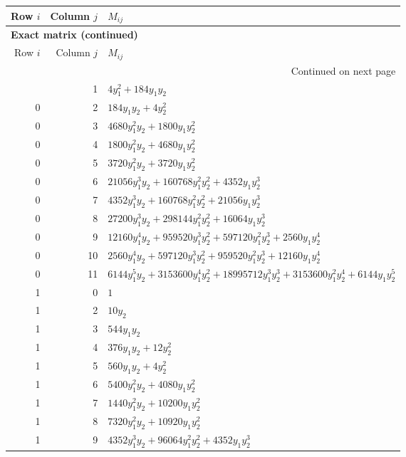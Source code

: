 \documentclass[10pt,a4paper]{article}
\begin{document}
{\small\setlength{\tabcolsep}{7pt}\begin{longtable}{rrp{125mm}}
\toprule Row $i$ & Column $j$ & $M_{ij}$\\\midrule\endfirsthead
\multicolumn{3}{l}{\textbf{Exact matrix (continued)}}\\
\toprule Row $i$ & Column $j$ & $M_{ij}$\\\midrule\endhead
\midrule\multicolumn{3}{r}{Continued on next page}\\\endfoot\bottomrule\endlastfoot
0 & 1 & $4 y_{1}^{2} + 184 y_{1} y_{2}$\\
0 & 2 & $184 y_{1} y_{2} + 4 y_{2}^{2}$\\
0 & 3 & $4680 y_{1}^{2} y_{2} + 1800 y_{1} y_{2}^{2}$\\
0 & 4 & $1800 y_{1}^{2} y_{2} + 4680 y_{1} y_{2}^{2}$\\
0 & 5 & $3720 y_{1}^{2} y_{2} + 3720 y_{1} y_{2}^{2}$\\
0 & 6 & $21056 y_{1}^{3} y_{2} + 160768 y_{1}^{2} y_{2}^{2} + 4352 y_{1} y_{2}^{3}$\\
0 & 7 & $4352 y_{1}^{3} y_{2} + 160768 y_{1}^{2} y_{2}^{2} + 21056 y_{1} y_{2}^{3}$\\
0 & 8 & $27200 y_{1}^{3} y_{2} + 298144 y_{1}^{2} y_{2}^{2} + 16064 y_{1} y_{2}^{3}$\\
0 & 9 & $12160 y_{1}^{4} y_{2} + 959520 y_{1}^{3} y_{2}^{2} + 597120 y_{1}^{2} y_{2}^{3} + 2560 y_{1} y_{2}^{4}$\\
0 & 10 & $2560 y_{1}^{4} y_{2} + 597120 y_{1}^{3} y_{2}^{2} + 959520 y_{1}^{2} y_{2}^{3} + 12160 y_{1} y_{2}^{4}$\\
0 & 11 & $6144 y_{1}^{5} y_{2} + 3153600 y_{1}^{4} y_{2}^{2} + 18995712 y_{1}^{3} y_{2}^{3} + 3153600 y_{1}^{2} y_{2}^{4} + 6144 y_{1} y_{2}^{5}$\\
1 & 0 & $1$\\
1 & 2 & $10 y_{2}$\\
1 & 3 & $544 y_{1} y_{2}$\\
1 & 4 & $376 y_{1} y_{2} + 12 y_{2}^{2}$\\
1 & 5 & $560 y_{1} y_{2} + 4 y_{2}^{2}$\\
1 & 6 & $5400 y_{1}^{2} y_{2} + 4080 y_{1} y_{2}^{2}$\\
1 & 7 & $1440 y_{1}^{2} y_{2} + 10200 y_{1} y_{2}^{2}$\\
1 & 8 & $7320 y_{1}^{2} y_{2} + 10920 y_{1} y_{2}^{2}$\\
1 & 9 & $4352 y_{1}^{3} y_{2} + 96064 y_{1}^{2} y_{2}^{2} + 4352 y_{1} y_{2}^{3}$\\

\end{longtable}}
\end{document}

